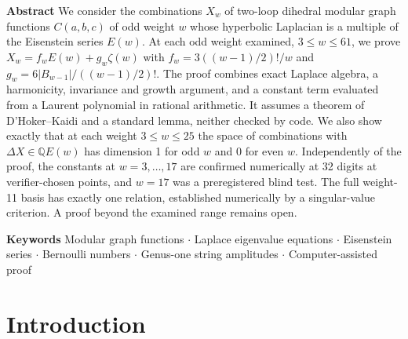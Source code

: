 \documentclass[10pt,twocolumn]{article}
\theoremstyle{definition}\newtheorem{definition}{Definition}\newtheorem{example}{Example}
\begin{document}
\thispagestyle{plain}
\noindent\textbf{Abstract} We consider the combinations \(X_w\) of two-loop dihedral modular graph functions \(C(a,b,c)\) of odd weight \(w\) whose hyperbolic Laplacian is a multiple of the Eisenstein series \(E(w)\). At each odd weight examined, \(3\le w\le 61\), we prove \(X_w=f_wE(w)+g_w\zeta(w)\) with \(f_w=3((w-1)/2)!/w\) and \(g_w=6|B_{w-1}|/((w-1)/2)!\). The proof combines exact Laplace algebra, a harmonicity, invariance and growth argument, and a constant term evaluated from a Laurent polynomial in rational arithmetic. It assumes a theorem of D'Hoker--Kaidi and a standard lemma, neither checked by code. We also show exactly that at each weight \(3\le w\le 25\) the space of combinations with \(\Delta X\in\mathbb{Q}E(w)\) has dimension 1 for odd \(w\) and 0 for even \(w\). Independently of the proof, the constants at \(w=3,\dots,17\) are confirmed numerically at 32 digits at verifier-chosen points, and \(w=17\) was a preregistered blind test. The full weight-11 basis has exactly one relation, established numerically by a singular-value criterion. A proof beyond the examined range remains open.
\par\medskip
\noindent\textbf{Keywords} Modular graph functions $\cdot$ Laplace eigenvalue equations $\cdot$ Eisenstein series $\cdot$ Bernoulli numbers $\cdot$ Genus-one string amplitudes $\cdot$ Computer-assisted proof\par\medskip
\section{Introduction}\label{introduction}
\end{document}

